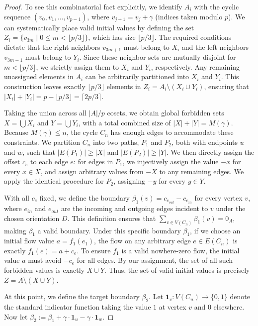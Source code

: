 \documentclass[10pt,a4paper]{amsart}
\renewcommand\ge\geqslant
\renewcommand\le\leqslant
\renewcommand\ge\geqslant
\begin{document}
\begin{proof}
To see this combinatorial fact explicitly, we identify $A_i$ with the cyclic sequence $(v_0, v_1, \dots, v_{p-1})$, where $v_{j+1} = v_j + \gamma$ (indices taken modulo $p$). We can systematically place valid initial values by defining the set $Z_i = \{v_{3m} \mid 0 \le m < \lfloor p/3 \rfloor\}$, which has size $\lfloor p/3 \rfloor$. The required conditions dictate that the right neighbors $v_{3m+1}$ must belong to $X_i$ and the left neighbors $v_{3m-1}$ must belong to $Y_i$. Since these neighbor sets are mutually disjoint for $m < \lfloor p/3 \rfloor$, we strictly assign them to $X_i$ and $Y_i$, respectively. Any remaining unassigned elements in $A_i$ can be arbitrarily partitioned into $X_i$ and $Y_i$. This construction leaves exactly $\lfloor p/3 \rfloor$ elements in $Z_i = A_i \setminus (X_i \cup Y_i)$, ensuring that $|X_i| + |Y_i| = p - \lfloor p/3 \rfloor = \lceil 2p/3 \rceil$.

Taking the union across all $|A|/p$ cosets, we obtain global forbidden sets $X = \bigcup X_i$ and $Y = \bigcup Y_i$, with a total combined size of $|X| + |Y| = M(\gamma)$.
%
Because $M(\gamma) \le n$, the cycle $C_n$ has enough edges to accommodate these constraints. We partition $C_n$ into two paths, $P_1$ and $P_2$, both with endpoints $u$ and $w$, such that $|E(P_1)| \ge |X|$ and $|E(P_2)| \ge |Y|$. We then directly assign the offset $c_e$ to each edge $e$: for edges in $P_1$, we injectively assign the value $-x$ for every $x \in X$, and assign arbitrary values from $-X$ to any remaining edges. We apply the identical procedure for $P_2$, assigning $-y$ for every $y \in Y$. 

With all $c_e$ fixed, we define the boundary $\beta_1(v) = c_{e_{out}} - c_{e_{in}}$ for every vertex $v$, where $e_{in}$ and $e_{out}$ are the incoming and outgoing edges incident to $v$ under the chosen orientation $D$. This definition ensures that $\sum_{v \in V(C_n)} \beta_1(v) = 0_A$, making $\beta_1$ a valid boundary. 
Under this specific boundary $\beta_1$, if we choose an initial flow value $a = f_1(e_1)$, the flow on any arbitrary edge $e \in E(C_n)$ is exactly $f_1(e) = a + c_e$. To ensure $f_1$ is a valid nowhere-zero flow, the initial value $a$ must avoid $-c_e$ for all edges. By our assignment, the set of all such forbidden values is exactly $X \cup Y$. Thus, the set of valid initial values is precisely $Z = A \setminus (X \cup Y)$.

At this point, we define the target boundary $\beta_2$. Let $\mathbf1_v: V(C_n) \to \{0, 1\}$ denote the standard indicator function taking the value $1$ at vertex $v$ and $0$ elsewhere. Now let $\beta_2:= \beta_1 + \gamma \cdot \mathbf1_{u} - \gamma \cdot \mathbf1_{w}$. 


\end{proof}
\end{document}
